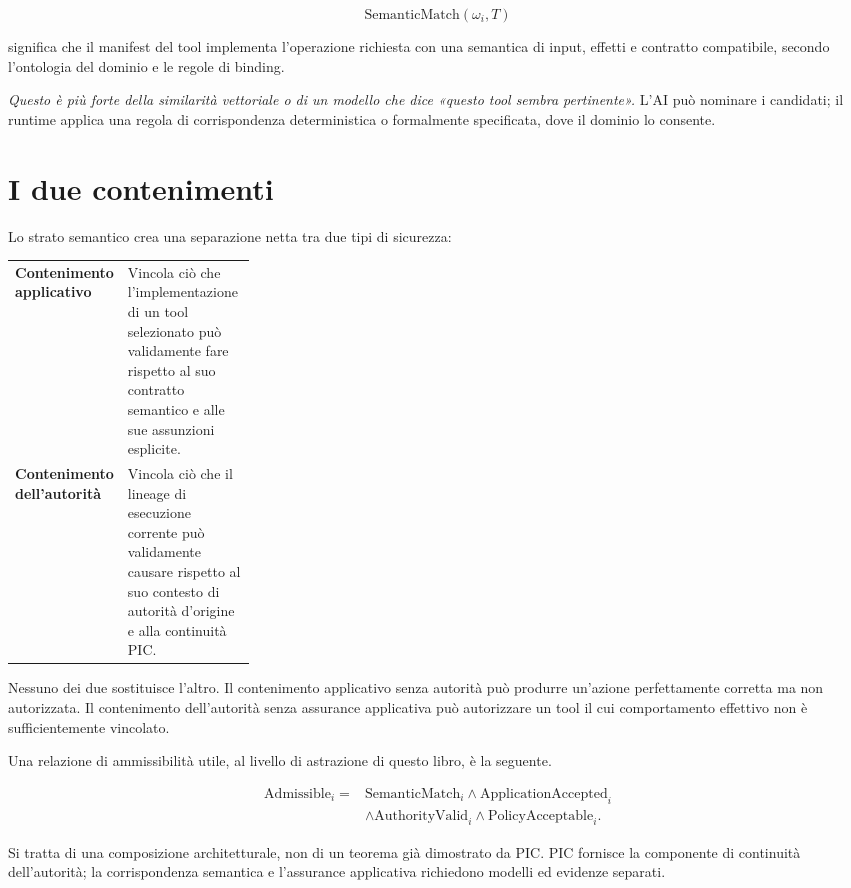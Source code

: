 \documentclass[10pt,oneside,openany]{book}
\begin{document}
\[
\mathrm{SemanticMatch}(\omega_i,T)
\]

significa che il manifest del tool implementa l'operazione richiesta con una semantica di input, effetti e contratto compatibile, secondo l'ontologia del dominio e le regole di binding.

\emph{Questo è più forte della similarità vettoriale o di un modello che dice «questo tool sembra pertinente».} L'AI può nominare i candidati; il runtime applica una regola di corrispondenza deterministica o formalmente specificata, dove il dominio lo consente.

\section{I due contenimenti}
Lo strato semantico crea una separazione netta tra due tipi di sicurezza:

\begin{center}
\begin{tabularx}{0.94\linewidth}{>{\bfseries}p{0.28\linewidth} X}
\toprule
Contenimento applicativo & Vincola ciò che l'implementazione di un tool selezionato può validamente fare rispetto al suo contratto semantico e alle sue assunzioni esplicite. \\
Contenimento dell'autorità & Vincola ciò che il lineage di esecuzione corrente può validamente causare rispetto al suo contesto di autorità d'origine e alla continuità PIC. \\
\bottomrule
\end{tabularx}
\end{center}

Nessuno dei due sostituisce l'altro. Il contenimento applicativo senza autorità può produrre un'azione perfettamente corretta ma non autorizzata. Il contenimento dell'autorità senza assurance applicativa può autorizzare un tool il cui comportamento effettivo non è sufficientemente vincolato.

Una relazione di ammissibilità utile, al livello di astrazione di questo libro, è la seguente.
\begin{formulabox}
\[
\begin{aligned}
\mathrm{Admissible}_i={}&\mathrm{SemanticMatch}_i
\land \mathrm{ApplicationAccepted}_i\\
&\land \mathrm{AuthorityValid}_i
\land \mathrm{PolicyAcceptable}_i.
\end{aligned}
\]
\end{formulabox}
Si tratta di una composizione architetturale, non di un teorema già dimostrato da PIC. PIC fornisce la componente di continuità dell'autorità; la corrispondenza semantica e l'assurance applicativa richiedono modelli ed evidenze separati.
\end{document}

